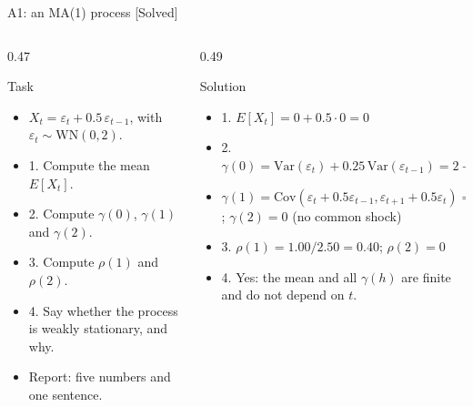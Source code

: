 \begin{frame}{A1: an MA(1) process [Solved]}
\itemsize{\scriptsize}
\begin{columns}[T]
\begin{column}{0.47\textwidth}
\begin{block}{Task}
\begin{itemize}
    \item $X_t = \varepsilon_t + 0.5\,\varepsilon_{t-1}$, with $\varepsilon_t \sim \mathrm{WN}(0, 2)$.
    \item 1. Compute the mean $E[X_t]$.
    \item 2. Compute $\gamma(0)$, $\gamma(1)$ and $\gamma(2)$.
    \item 3. Compute $\rho(1)$ and $\rho(2)$.
    \item 4. Say whether the process is weakly stationary, and why.
    \item Report: five numbers and one sentence.
\end{itemize}
\end{block}
\end{column}
\begin{column}{0.49\textwidth}
\begin{exampleblock}{Solution}
\begin{itemize}
    \item 1. $E[X_t] = 0 + 0.5 \cdot 0 = 0$
    \item 2. $\gamma(0) = \mathrm{Var}(\varepsilon_t) + 0.25\,\mathrm{Var}(\varepsilon_{t-1}) = 2 + 0.5 = 2.50$
    \item $\gamma(1) = \mathrm{Cov}(\varepsilon_t + 0.5\varepsilon_{t-1}, \varepsilon_{t+1} + 0.5\varepsilon_t) = 0.5 \cdot 2 = 1.00$; $\gamma(2) = 0$ (no common shock)
    \item 3. $\rho(1) = 1.00/2.50 = 0.40$; $\rho(2) = 0$
    \item 4. Yes: the mean and all $\gamma(h)$ are finite and do not depend on $t$.
\end{itemize}
\end{exampleblock}
\end{column}
\end{columns}
\end{frame}

